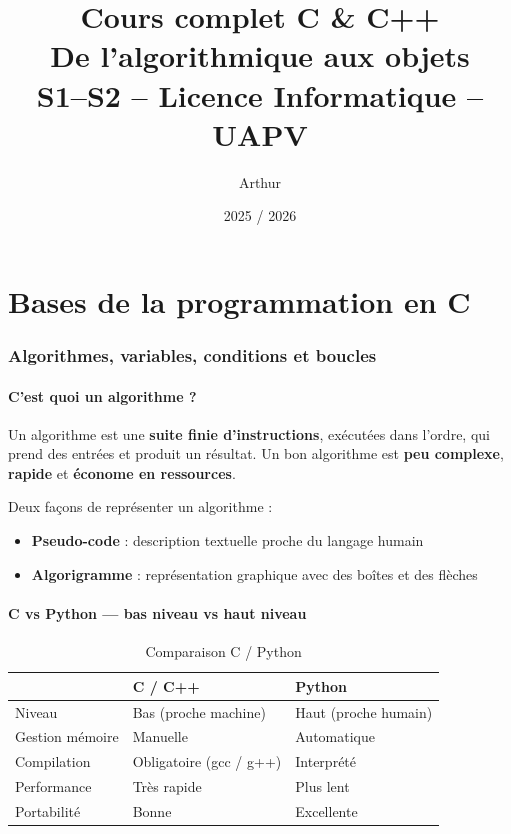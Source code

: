 \documentclass[12pt,a4paper]{article}
\title{\Huge\textbf{Cours complet C \& C++}\\[0.5cm]
\Large De l'algorithmique aux objets\\[0.3cm]
\large S1--S2 -- Licence Informatique -- UAPV}
\author{Arthur}
\date{2025 / 2026}
\begin{document}
\maketitle
\thispagestyle{empty}

\newpage
\tableofcontents
\newpage


\part{Bases de la programmation en C}

\section{Algorithmes, variables, conditions et boucles}

\subsection{C'est quoi un algorithme ?}

Un algorithme est une \textbf{suite finie d'instructions}, exécutées dans l'ordre, qui prend des entrées et produit un résultat.
Un bon algorithme est \textbf{peu complexe}, \textbf{rapide} et \textbf{économe en ressources}.

\begin{exemple}
Deux façons de représenter un algorithme :
\begin{itemize}
    \item \textbf{Pseudo-code} : description textuelle proche du langage humain
    \item \textbf{Algorigramme} : représentation graphique avec des boîtes et des flèches
\end{itemize}
\end{exemple}

\subsection{C vs Python — bas niveau vs haut niveau}

\begin{table}[h!]
\centering
\caption{Comparaison C / Python}
\begin{tabular}{lll}
\toprule
 & \textbf{C / C++} & \textbf{Python} \\
\midrule
Niveau & Bas (proche machine) & Haut (proche humain) \\
Gestion mémoire & Manuelle & Automatique \\
Compilation & Obligatoire (gcc / g++) & Interprété \\
Performance & Très rapide & Plus lent \\
Portabilité & Bonne & Excellente \\
\bottomrule
\end{tabular}
\end{table}
\end{document}
